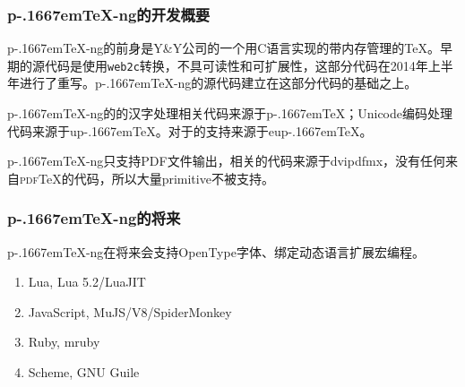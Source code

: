 \documentclass[dvipdfmx]{beamer}
\newcommand{\pTeX}{p\kern-.1667em\TeX}
\newcommand{\ptexng}{\pTeX-ng}
\begin{document}
%
\begin{frame}[fragile]
\frametitle{\bf \ptexng 的开发概要}

\ptexng 的前身是Y\&Y公司的一个用C语言实现的带内存管理的\TeX。早期的源代码是使用{\texttt{web2c}}转换，不具可读性和可扩展性，这部分代码在2014年上半年进行了重写。\ptexng 的源代码建立在这部分代码的基础之上。

\ptexng 的的汉字处理相关代码来源于\pTeX；Unicode编码处理代码来源于u\pTeX。对于的支持来源于eu\pTeX。

\ptexng 只支持PDF文件输出，相关的代码来源于dvipdfmx，没有任何来自{\textsc{pdf}\TeX}的代码，所以大量primitive不被支持。
\end{frame}
%
\begin{frame}[fragile]
\frametitle{\bf \ptexng 的将来}
\ptexng 在将来会支持OpenType字体、绑定动态语言扩展宏编程。
\begin{enumerate}
\item Lua, Lua 5.2/LuaJIT
\item JavaScript, MuJS/V8/SpiderMonkey
\item Ruby, mruby
\item Scheme, GNU Guile
\end{enumerate}
\end{frame}
%
%
\end{document}
